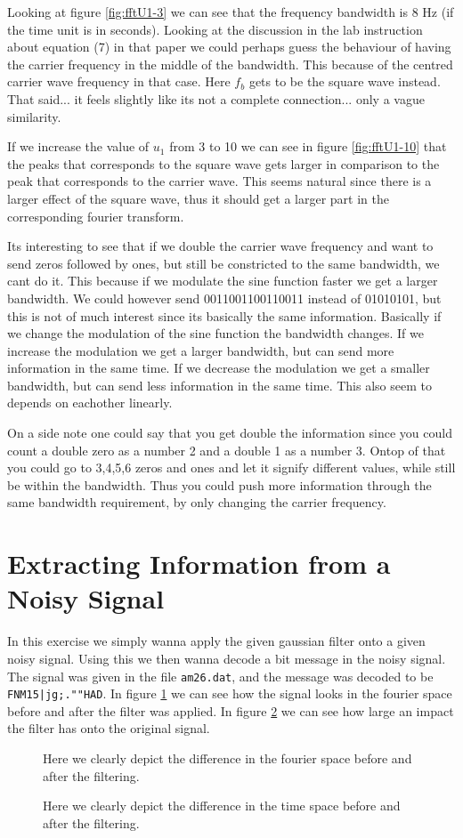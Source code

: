 \documentclass[11pt]{article}
\begin{document}
Looking at figure \ref{fig:fftU1-3} we can see that the frequency bandwidth is 8 Hz (if the time unit is in seconds). Looking at the discussion in the lab instruction about equation (7) in that paper we could perhaps guess the behaviour of having  the carrier frequency in the middle of the bandwidth. This because of the centred carrier wave frequency in that case. Here $f_b$ gets to be the square wave instead. That said... it feels slightly like its not a complete connection... only a vague similarity. 

If we increase the value of $u_1$ from 3 to 10 we can see in figure \ref{fig:fftU1-10} that the peaks that corresponds to the square wave gets larger in comparison to the peak that corresponds to the carrier wave. This seems natural since there is a larger effect of the square wave, thus it should get a larger part in the corresponding fourier transform. 

Its interesting to see that if we double the carrier wave frequency and want to send zeros followed by ones, but still be constricted to the same bandwidth, we cant do it. This because if we modulate the sine function faster we get a larger bandwidth. We could however send 0011001100110011 instead of 01010101, but this is not of much interest since its basically the same information. Basically if we change the modulation of the sine function the bandwidth changes. If we increase the modulation we get a larger bandwidth, but can send more information in the same time. If we decrease the modulation we get a smaller bandwidth, but can send less information in the same time. This also seem to depends on eachother linearly. 

On a side note one could say that you get double the information since you could count a double zero as a number 2 and a double 1 as a number 3. Ontop of that you could go to 3,4,5,6 zeros and ones and let it signify different values, while still be within the bandwidth. Thus you could push more information through the same bandwidth requirement, by only changing the carrier frequency. 

\newpage
\section{Extracting Information from a Noisy Signal}
In this exercise we simply wanna apply the given gaussian filter onto a given noisy signal. Using this we then wanna decode a bit message in the noisy signal. The signal was given in the file \verb+am26.dat+, and the message was decoded to be \verb+FNM15|jg;.""HAD+. In figure \ref{fig:freqPowSpec} we can see how the signal looks in the fourier space before and after the filter was applied. In figure \ref{fig:signal} we can see how large an impact the filter has onto the original signal. 
\begin{figure}[H]
	\centering
	\newlength\figureheight 
	\newlength\figurewidth 
	\setlength\figureheight{8cm} 
	\setlength\figurewidth{6cm}
	
	\caption{Here we clearly depict the difference in the fourier space before and after the filtering.}
	\label{fig:freqPowSpec}
\end{figure}

\begin{figure}[H]
	\centering
	\setlength\figureheight{8cm} 
	\setlength\figurewidth{6cm}
	
	\caption{Here we clearly depict the difference in the time space before and after the filtering.}
	\label{fig:signal}
\end{figure}
\end{document}
